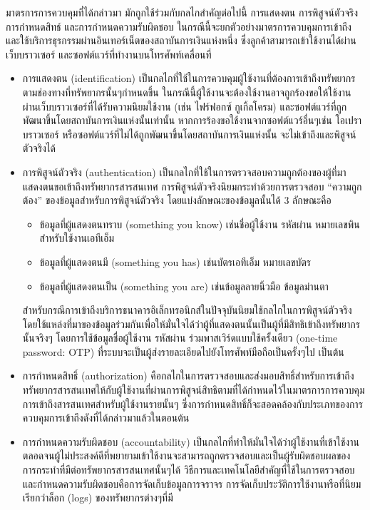 \documentclass[../th_cyber_warfare_distilled.tex]{subfiles}
\begin{document}
มาตรการการควบคุมที่ได้กล่าวมา มักถูกใช้ร่วมกับกลไกสำคัญต่อไปนี้ การแสดงตน การพิสูจน์ตัวจริง การกำหนดสิทธ์ และการกำหนดความรับผิดชอบ ในกรณีนี้จะยกตัวอย่างมาตรการควบคุมการเข้าถึงและใช้บริการธุรกรรมผ่านอินเทอร์เน็ตของสถาบันการเงินแห่งหนึ่ง ซึ่งลูกค้าสามารถเข้าใช้งานได้ผ่านเว็บบราวเซอร์ และซอฟต์แวร์ที่ทำงานบนโทรศัพท์เคลื่อนที่
\begin{itemize}
	\item การแสดงตน (identification) เป็นกลไกที่ใช้ในการควบคุมผู้ใช้งานที่ต้องการเข้าถึงทรัพยากรตามช่องทางที่ทรัพยากรนั้นๆกำหนดขึ้น ในกรณีนี้ผู้ใช้งานจะต้องใช้งานอาจถูกร้องขอให้ใช้งานผ่านเว็บบราวเซอร์ที่ได้รับความนิยมใช้งาน (เช่น ไฟร์ฟอกซ์ กูเกิ้ลโครม) และซอฟต์แวร์ที่ถูกพัฒนาขึ้นโดยสถาบันการเงินแห่งนั้นเท่านั้น หากการร้องขอใช้งานจากซอฟต์แวร์อื่นๆเช่น โอเปราบราวเซอร์ หรือซอฟต์แวร์ที่ไม่ได้ถูกพัฒนาขึ้นโดยสถาบันการเงินแห่งนั้น จะไม่เข้าถึงและพิสูจน์ตัวจริงได้
	\item การพิสูจน์ตัวจริง (authentication) เป็นกลไกที่ใช้ในการตรวจสอบความถูกต้องของผู้ที่มาแสดงตนขอเข้าถึงทรัพยากรสารสนเทศ การพิสูจน์ตัวจริงนิยมกระทำด้วยการตรวจสอบ “ความถูกต้อง” ของข้อมูลสำหรับการพิสูจน์ตัวจริง โดยแบ่งลักษณะของข้อมูลนั้นได้ 3 ลักษณะคือ
	\begin{itemize}
		\item ข้อมูลที่ผู้แสดงตนทราบ (something you know) เช่นชื่อผู้ใช้งาน รหัสผ่าน หมายเลขพินสำหรับใช้งานเอทีเอ็ม
		\item ข้อมูลที่ผู้แสดงตนมี (something you has) เช่นบัตรเอทีเอ็ม หมายเลขบัตร 
		\item ข้อมูลที่ผู้แสดงตนเป็น (something you are) เช่นข้อมูลลายนิ้วมือ ข้อมูลม่านตา 
	\end{itemize}
	สำหรับกรณีการเข้าถึงบริการธนาคารอิเล็กทรอนิกส์ในปัจจุบันนิยมใช้กลไกในการพิสูจน์ตัวจริงโดยใช้แหล่งที่มาของข้อมูลร่วมกันเพื่อให้มั่นใจได้ว่าผู้ที่แสดงตนนั้นเป็นผู้ที่มีสิทธิเข้าถึงทรัพยากรนั้นจริงๆ โดยการใช้ข้อมูลชื่อผู้ใช้งาน รหัสผ่าน ร่วมพาสเวิร์ดแบบใช้ครั้งเดียว (one-time password: OTP) ที่ระบบจะเป็นผู้ส่งรายละเอียดไปยังโทรศัพท์มือถือเป็นครั้งๆไป เป็นต้น
	\item การกำหนดสิทธิ์ (authorization) คือกลไกในการตรวจสอบและส่งมอบสิทธิ์สำหรับการเข้าถึงทรัพยากรสารสนเทศให้กับผู้ใช้งานที่ผ่านการพิสูจน์สิทธิตามที่ได้กำหนดไว้ในมาตรการการควบคุมการเข้าถึงสารสนเทศสำหรับผู้ใช้งานรายนั้นๆ ซึ่งการกำหนดสิทธิ์ก็จะสอดคล้องกับประเภทของการควบคุมการเข้าถึงดังที่ได้กล่าวมาแล้วในตอนต้น
	\item การกำหนดความรับผิดชอบ (accountability) เป็นกลไกที่ทำให้มั่นใจได้ว่าผู้ใช้งานที่เข้าใช้งาน ตลอดจนผู้ไม่ประสงค์ดีที่พยายามเข้าใช้งานจะสามารถถูกตรวจสอบและเป็นผู้รับผิดชอบผลของการกระทำที่มีต่อทรัพยากรสารสนเทศนั้นๆได้ วิธีการและเทคโนโลยีสำคัญที่ใช้ในการตรวจสอบและกำหนดความรับผิดชอบคือการจัดเก็บข้อมูลการจราจร การจัดเก็บประวัติการใช้งานหรือที่นิยมเรียกว่าล็อก (logs) ของทรัพยากรต่างๆที่มี 
\end{itemize}
\end{document}
